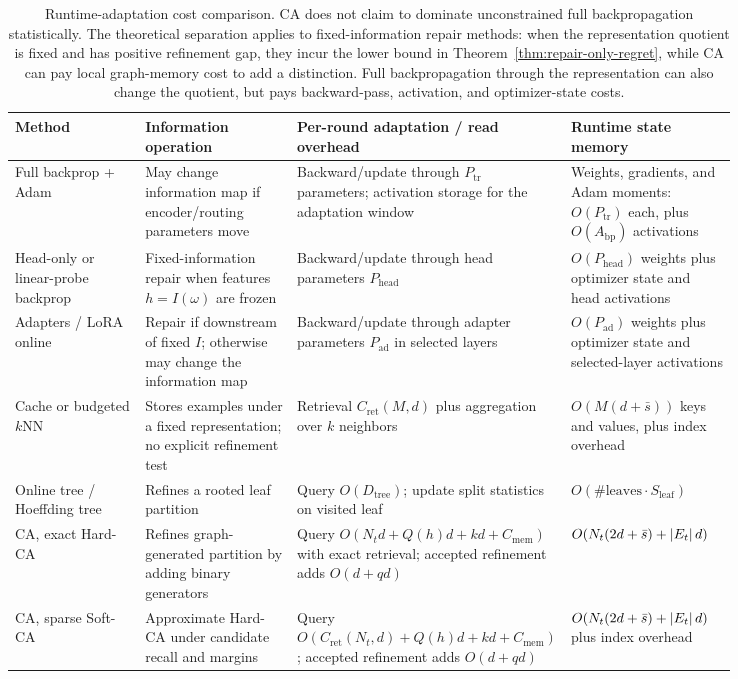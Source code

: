 \begin{table}[t]
\centering
\small
\begin{tabular}{>{\raggedright\arraybackslash}p{0.18\linewidth}
>{\raggedright\arraybackslash}p{0.21\linewidth}
>{\raggedright\arraybackslash}p{0.22\linewidth}
>{\raggedright\arraybackslash}p{0.23\linewidth}}
\toprule
Method & Information operation & Per-round adaptation / read overhead & Runtime state memory \\
\midrule
Full backprop + Adam & May change information map if encoder/routing parameters move & Backward/update through $P_{\mathrm{tr}}$ parameters; activation storage for the adaptation window & Weights, gradients, and Adam moments: $O(P_{\mathrm{tr}})$ each, plus $O(A_{\mathrm{bp}})$ activations \\
Head-only or linear-probe backprop & Fixed-information repair when features $h=I(\omega)$ are frozen & Backward/update through head parameters $P_{\mathrm{head}}$ & $O(P_{\mathrm{head}})$ weights plus optimizer state and head activations \\
Adapters / LoRA online & Repair if downstream of fixed $I$; otherwise may change the information map & Backward/update through adapter parameters $P_{\mathrm{ad}}$ in selected layers & $O(P_{\mathrm{ad}})$ weights plus optimizer state and selected-layer activations \\
Cache or budgeted $k$NN & Stores examples under a fixed representation; no explicit refinement test & Retrieval $C_{\mathrm{ret}}(M,d)$ plus aggregation over $k$ neighbors & $O(M(d+\bar s))$ keys and values, plus index overhead \\
Online tree / Hoeffding tree & Refines a rooted leaf partition & Query $O(D_{\mathrm{tree}})$; update split statistics on visited leaf & $O(\#\mathrm{leaves}\cdot S_{\mathrm{leaf}})$ \\
CA, exact Hard-CA & Refines graph-generated partition by adding binary generators & Query $O(N_td+Q(h)d+kd+C_{\mathrm{mem}})$ with exact retrieval; accepted refinement adds $O(d+qd)$ & $O(N_t(2d+\bar s)+\left\lvert E_t\right\rvert d)$ \\
CA, sparse Soft-CA & Approximate Hard-CA under candidate recall and margins & Query $O(C_{\mathrm{ret}}(N_t,d)+Q(h)d+kd+C_{\mathrm{mem}})$; accepted refinement adds $O(d+qd)$ & $O(N_t(2d+\bar s)+\left\lvert E_t\right\rvert d)$ plus index overhead \\
\bottomrule
\end{tabular}
\caption{Runtime-adaptation cost comparison. CA does not claim to dominate unconstrained full backpropagation statistically. The theoretical separation applies to fixed-information repair methods: when the representation quotient is fixed and has positive refinement gap, they incur the lower bound in Theorem~\ref{thm:repair-only-regret}, while CA can pay local graph-memory cost to add a distinction. Full backpropagation through the representation can also change the quotient, but pays backward-pass, activation, and optimizer-state costs.}
\label{tab:runtime-memory-comparison}
\end{table}

